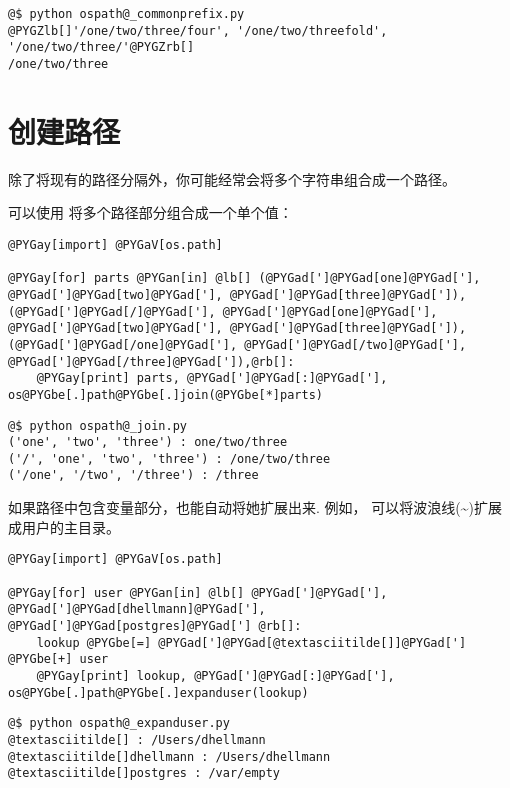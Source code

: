 \documentclass[a4paper,10pt,english]{manual}
\begin{document}
\begin{Verbatim}[commandchars=@\[\]]
@$ python ospath@_commonprefix.py
@PYGZlb[]'/one/two/three/four', '/one/two/threefold', '/one/two/three/'@PYGZrb[]
/one/two/three
\end{Verbatim}


\section{创建路径}

除了将现有的路径分隔外，你可能经常会将多个字符串组合成一个路径。

可以使用  将多个路径部分组合成一个单个值：

\begin{Verbatim}[commandchars=@\[\]]
@PYGay[import] @PYGaV[os.path]

@PYGay[for] parts @PYGan[in] @lb[] (@PYGad[']@PYGad[one]@PYGad['], @PYGad[']@PYGad[two]@PYGad['], @PYGad[']@PYGad[three]@PYGad[']),(@PYGad[']@PYGad[/]@PYGad['], @PYGad[']@PYGad[one]@PYGad['], @PYGad[']@PYGad[two]@PYGad['], @PYGad[']@PYGad[three]@PYGad[']),(@PYGad[']@PYGad[/one]@PYGad['], @PYGad[']@PYGad[/two]@PYGad['], @PYGad[']@PYGad[/three]@PYGad[']),@rb[]:
    @PYGay[print] parts, @PYGad[']@PYGad[:]@PYGad['], os@PYGbe[.]path@PYGbe[.]join(@PYGbe[*]parts)
\end{Verbatim}

\begin{Verbatim}[commandchars=@\[\]]
@$ python ospath@_join.py
('one', 'two', 'three') : one/two/three
('/', 'one', 'two', 'three') : /one/two/three
('/one', '/two', '/three') : /three
\end{Verbatim}

如果路径中包含变量部分，也能自动将她扩展出来. 例如，  可以将波浪线(\textasciitilde{})扩展成用户的主目录。

\begin{Verbatim}[commandchars=@\[\]]
@PYGay[import] @PYGaV[os.path]

@PYGay[for] user @PYGan[in] @lb[] @PYGad[']@PYGad['], @PYGad[']@PYGad[dhellmann]@PYGad['], @PYGad[']@PYGad[postgres]@PYGad['] @rb[]:
    lookup @PYGbe[=] @PYGad[']@PYGad[@textasciitilde[]]@PYGad['] @PYGbe[+] user
    @PYGay[print] lookup, @PYGad[']@PYGad[:]@PYGad['], os@PYGbe[.]path@PYGbe[.]expanduser(lookup)
\end{Verbatim}

\begin{Verbatim}[commandchars=@\[\]]
@$ python ospath@_expanduser.py
@textasciitilde[] : /Users/dhellmann
@textasciitilde[]dhellmann : /Users/dhellmann
@textasciitilde[]postgres : /var/empty
\end{Verbatim}
\end{document}
